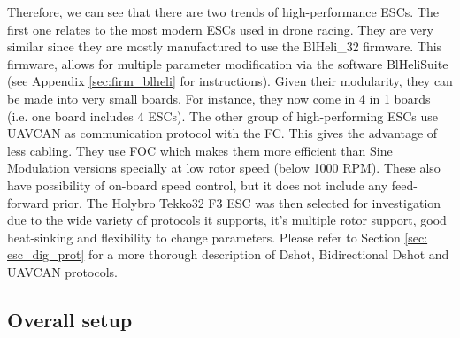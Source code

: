 Therefore, we can see that there are two trends of high-performance ESCs. The first one relates to the most modern ESCs used in drone racing. They are very similar since they are mostly manufactured to use the BlHeli\_32 firmware. This firmware, allows for multiple parameter modification via the software BlHeliSuite (see Appendix \ref{sec:firm_blheli} for instructions). Given their modularity, they can be made into very small boards. For instance, they now come in 4 in 1 boards (i.e. one board includes 4 ESCs). The other group of high-performing ESCs use UAVCAN as communication protocol with the FC. This gives the advantage of less cabling. They use FOC which makes them more efficient than Sine Modulation versions specially at low rotor speed (below 1000 RPM). These also have possibility of on-board speed control, but it does not include any feed-forward prior.  The Holybro Tekko32 F3 ESC was then selected for investigation due to the wide variety of protocols it supports, it's multiple rotor support, good heat-sinking and flexibility to change parameters. Please refer to Section \ref{sec: esc_dig_prot} for a more thorough description of Dshot, Bidirectional Dshot and UAVCAN protocols.

\subsection{Overall setup}

